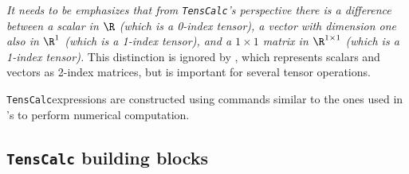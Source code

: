\documentclass[11pt]{article}
\newcommand{\TC}{\texttt{TensCalc}}
\theoremstyle{remark}
\begin{document}
\medskip

\emph{It needs to be emphasizes that from \TC's perspective there is a
  difference between a scalar in $\R$ (which is a 0-index tensor), a
  vector with dimension one also in $\R^1$ (which is a 1-index tensor),
  and a $1\times 1$ matrix in $\R^{1\times 1}$ (which is a 1-index tensor).} This
distinction is ignored by \matlab{}, which represents scalars and
vectors as 2-index matrices, but is important for several tensor
operations.

\medskip

\TC expressions are constructed using commands similar to the ones
used in \matlab{}'s to perform numerical computation.

\subsection{\TC{} building blocks}\label{se:tokens}
\end{document}
